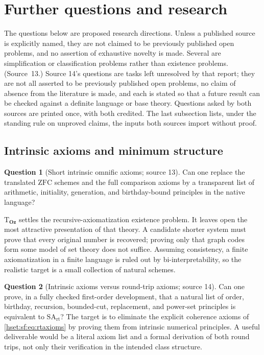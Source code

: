 \documentclass[11pt,letterpaper]{article}
\theoremstyle{definition}
\newtheorem{question}[question]{Question}\aliascntresetthe{question}
\theoremstyle{remark}
\newcommand{\ZFC}{\mathrm{ZFC}}
\newcommand{\Oz}{\mathbf{Oz}}
\newcommand{\Tth}{\mathrm{T}}
\newcommand{\SArt}{\mathrm{SA}_{\mathrm{rt}}}
\begin{document}
\section{Further questions and research}
\label{hset:sf:sec:research}

The questions below are proposed research directions. Unless a published source is
explicitly named, they are not claimed to be previously published open problems, and
no assertion of exhaustive novelty is made. Several are simplification or
classification problems rather than existence problems. (Source~13.) Source 14's
questions are tasks left unresolved by that report; they are not all asserted to be
previously published open problems, no claim of absence from the literature is
made, and each is stated so that a future result can be checked against a definite
language or base theory. Questions asked by both sources are printed once, with
both credited. The last subsection lists, under the standing rule on unproved
claims, the inputs both sources import without proof.

\subsection{Intrinsic axioms and minimum structure}

\begin{question}[Short intrinsic omnific axioms; source 13]\label{hset:sf:q:shortaxioms}
Can one replace the translated $\ZFC$ schemes and the full comparison axioms by a
transparent list of arithmetic, initiality, generation, and birthday-bound principles
in the native language?
\end{question}

$\Tth_{\Oz}$ settles the recursive-axiomatization existence problem. It leaves open
the most attractive presentation of that theory. A candidate shorter system must
prove that every original number is recovered; proving only that graph codes form
some model of set theory does not suffice. Assuming consistency, a finite
axiomatization in a finite language is ruled out by bi-interpretability, so the
realistic target is a small collection of natural schemes.

\begin{question}[Intrinsic axioms versus round-trip axioms; source 14]\label{hset:sf:q:intrinsic}
Can one prove, in a fully checked first-order development, that a natural list of
order, birthday, recursion, bounded-cut, replacement, and power-set principles is
equivalent to $\SArt$? The target is to eliminate the explicit coherence axioms of
\eqref{hset:sf:eq:rtaxioms} by proving them from intrinsic numerical principles. A
useful deliverable would be a literal axiom list and a formal derivation of both
round trips, not only their verification in the intended class structure.
\end{question}
\end{document}

